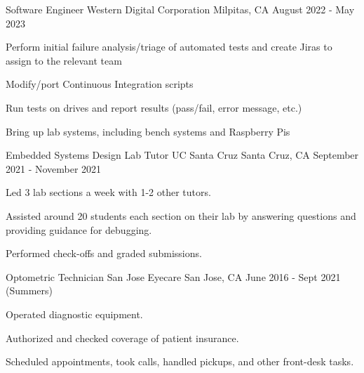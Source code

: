 
\begin{cventries}
  \cventry
    {Software Engineer} %
    {Western Digital Corporation} %
    {Milpitas, CA} %
    {August 2022 - May 2023} %
    {
      \begin{cvitems} %
        \item {Perform initial failure analysis/triage of automated tests and create Jiras to assign to the relevant team}
        \item {Modify/port Continuous Integration scripts}
        \item {Run tests on drives and report results (pass/fail, error message, etc.)}
        \item {Bring up lab systems, including bench systems and Raspberry Pis}
      \end{cvitems}
    }

  \cventry
    {Embedded Systems Design Lab Tutor} %
    {UC Santa Cruz} %
    {Santa Cruz, CA} %
    {September 2021 - November 2021} %
    {
      \begin{cvitems} %
        \item {Led 3 lab sections a week with 1-2 other tutors.}
        \item {Assisted around 20 students each section on their lab by answering questions and providing guidance for debugging.}
        \item {Performed check-offs and graded submissions.}
      \end{cvitems}
    }

  \cventry
    {Optometric Technician} %
    {San Jose Eyecare} %
    {San Jose, CA} %
    {June 2016 - Sept 2021 (Summers)} %
    {
      \begin{cvitems} %
        \item {Operated diagnostic equipment.}
        \item {Authorized and checked coverage of patient insurance.}
        \item {Scheduled appointments, took calls, handled pickups, and other front-desk tasks.}
      \end{cvitems}
    }
\end{cventries}
